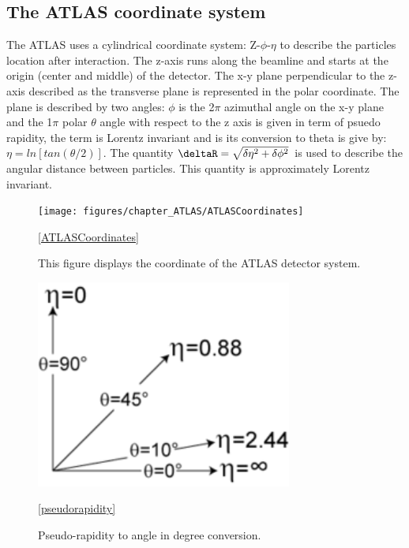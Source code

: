 \subsection*{The ATLAS coordinate system}

The ATLAS uses a cylindrical coordinate system: Z-$\phi$-$\eta$ to describe the particles location after interaction.
The z-axis runs along the beamline and starts at the origin (center and middle) of the detector. The x-y plane perpendicular to the z-axis described as the transverse plane is represented in the polar coordinate. The plane is described by two angles: $\phi$ is the 2$\pi$ azimuthal angle on the x-y plane and the 1$\pi$ polar $\theta$ angle with respect to the z axis is given in term of psuedo rapidity, the term is Lorentz invariant and is its conversion to theta is give by: $\eta=ln[tan(\theta/2)]$. The quantity $\deltaR=\sqrt{\delta\eta^{2}+
\delta\phi^{2}} $ is used to describe the angular distance between particles. This quantity is approximately Lorentz invariant. 

\begin{figure}[!htb]
    \begin{center}
        \texttt{[image: figures/chapter\_ATLAS/ATLASCoordinates]}
        \caption{
			This figure displays the coordinate of the ATLAS detector system. \cite{2008} 
        }
        \label{fig:Coordinates}
        \ref{ATLASCoordinates}
    \end{center}
\end{figure}

\begin{figure}[!htb]
    \begin{center}
        \includegraphics[width=0.75\textwidth]{figures/chapter_ATLAS/pseudorapidity}
        \caption{
			Pseudo-rapidity \eta to angle in degree conversion. \cite{enwiki:1052183914} 
        }
        \label{fig:pseudorapidity}
        \ref{pseudorapidity}
    \end{center}
\end{figure}




